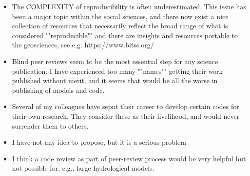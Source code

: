 \documentclass{article}
\begin{document}
\begin{itemize}
	\item The COMPLEXITY of reproducibility is often underestimated. This issue has been a major topic within the social sciences, and there now exist a nice collection of resources that necessarily reflect the broad range of what is considered ""reproducible"" and there are insights and resources portable to the geosciences, see e.g. https://www.bitss.org/
	\item Blind peer reviews seem to be the most essential step for any science publication.  I have experienced too many ""names"" getting their work published without merit, and it seems that would be all the worse in publishing of models and code.
	\item Several of my colleagues have sepnt their career to develop certain codes for their own research. They consider these as their livelihood, and would never surrender them to others.
	\item I have not any idea to propose, but it is a serious problem
	\item I think a code review as part of peer-review process would be very helpful but not possible for, e.g., large hydrological models.
\end{itemize}
\end{document}
